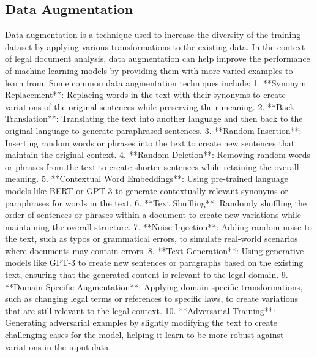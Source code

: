 \documentclass[conference]{IEEEtran}
\begin{document}
\subsection{Data Augmentation}
Data augmentation is a technique used to increase the diversity of the training dataset by applying various transformations to the existing data. In the context of legal document analysis, data augmentation can help improve the performance of machine learning models by providing them with more varied examples to learn from. Some common data augmentation techniques include:
1. **Synonym Replacement**: Replacing words in the text with their synonyms to create variations of the original sentences while preserving their meaning.
2. **Back-Translation**: Translating the text into another language and then back to the original language to generate paraphrased sentences.
3. **Random Insertion**: Inserting random words or phrases into the text to create new sentences that maintain the original context.
4. **Random Deletion**: Removing random words or phrases from the text to create shorter sentences while retaining the overall meaning.
5. **Contextual Word Embeddings**: Using pre-trained language models like BERT or GPT-3 to generate contextually relevant synonyms or paraphrases for words in the text.
6. **Text Shuffling**: Randomly shuffling the order of sentences or phrases within a document to create new variations while maintaining the overall structure.
7. **Noise Injection**: Adding random noise to the text, such as typos or grammatical errors, to simulate real-world scenarios where documents may contain errors.
8. **Text Generation**: Using generative models like GPT-3 to create new sentences or paragraphs based on the existing text, ensuring that the generated content is relevant to the legal domain.
9. **Domain-Specific Augmentation**: Applying domain-specific transformations, such as changing legal terms or references to specific laws, to create variations that are still relevant to the legal context.
10. **Adversarial Training**: Generating adversarial examples by slightly modifying the text to create challenging cases for the model, helping it learn to be more robust against variations in the input data.
\end{document}
